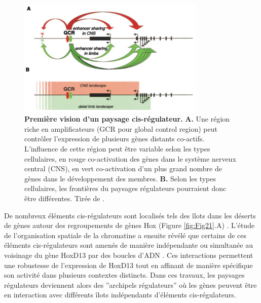 \begin{figure}[h]
    \centering
    \includegraphics[width=0.8\textwidth, page=1] {figures/introduction/fig20.png}
    \caption[Première vision d'un paysage \gls{cis}-régulateur.]{
    \textbf{Première vision d'un paysage \gls{cis}-régulateur.}
    \textbf{A.} Une région riche en \glspl{amplificateur} (GCR pour global control region) peut contrôler l'expression de plusieurs gènes distants co-actifs. L'influence de cette région peut être variable selon les types cellulaires, en rouge co-activation des gènes dans le système nerveux central (CNS), en vert co-activation d'un plus grand nombre de gènes dans le développement des membres. \textbf{B.} Selon les types cellulaires, les frontières du paysages régulateurs pourraient donc être différentes. Tirée de \citep{spitz_global_2003}.\\
    }
    \label{fig:Fig20}
\end{figure}

De nombreux éléments \gls{cis}-régulateurs sont localisés tels des îlots dans les déserts de gènes autour des regroupements de gènes Hox (Figure \ref{fig:Fig21}.A) \citep{montavon_regulatory_2011}. L’étude de l’organisation spatiale de la chromatine a ensuite révélé que certains de ces éléments \gls{cis}-régulateurs sont amenés de manière indépendante ou simultanée au voisinage du gène HoxD13 par des boucles d’ADN \citep{montavon_regulatory_2011}. Ces interactions permettent une robustesse de l’expression de HoxD13 tout en affinant de manière spécifique son activité dans plusieurs contextes distincts. Dans ces travaux, les paysages régulateurs deviennent alors des ”archipels régulateurs” où les gènes peuvent être en interaction avec différents îlots indépendants d’éléments \gls{cis}-régulateurs. \\

